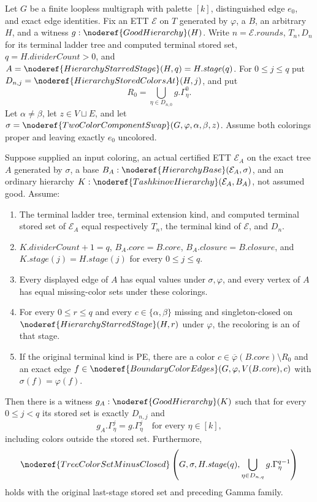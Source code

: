 \begin{helper}
Let $G$ be a finite loopless multigraph with palette $[k]$,
distinguished edge $e_0$, and exact edge identities.
Fix an ETT $\mathcal E$ on $T$ generated by $\varphi$, a
 $B$, an arbitrary
 $H$, and a witness
$g:\noderef{GoodHierarchy}(H)$.  Write $n=\mathcal E.\mathit{rounds}$,
$T_n,D_n$ for its terminal ladder tree and computed terminal stored set,
$q=H.\mathit{dividerCount}>0$, and
$A=\noderef{HierarchyStarredStage}(H,q)=H.\mathit{stage}(q)$.
For $0\le j\le q$ put $D_{n,j}=\noderef{HierarchyStoredColorsAt}(H,j)$,
and put
\[
 R_0=\bigcup_{\eta\in D_{n,0}}g.\Gamma^0_\eta.
\]
Let $\alpha\ne\beta$, let $z\in V\sqcup E$, and let
$\sigma=\noderef{TwoColorComponentSwap}(G,\varphi,\alpha,\beta,z)$.
Assume both colorings proper and leaving exactly $e_0$ uncolored.

Suppose supplied an input coloring, an actual certified ETT
$\mathcal E_A$ on the exact tree $A$ generated by $\sigma$, a base
$B_A:\noderef{HierarchyBase}(\mathcal E_A,\sigma)$, and an ordinary
hierarchy $K:\noderef{TashkinovHierarchy}(\mathcal E_A,B_A)$,
not assumed good.  Assume:
\begin{enumerate}
\item The terminal ladder tree, terminal extension kind, and computed
terminal stored set of $\mathcal E_A$ equal respectively $T_n$, the
terminal kind of $\mathcal E$, and $D_n$.
\item $K.\mathit{dividerCount}+1=q$, $B_A.\mathit{core}=B.\mathit{core}$,
$B_A.\mathit{closure}=B.\mathit{closure}$, and
$K.\mathit{stage}(j)=H.\mathit{stage}(j)$ for every $0\le j\le q$.
\item Every displayed edge of $A$ has equal values under $\sigma,\varphi$,
and every vertex of $A$ has equal missing-color sets under these colorings.
\item For every $0\le r\le q$ and every $c\in\{\alpha,\beta\}$ missing
and singleton-closed on $\noderef{HierarchyStarredStage}(H,r)$ under
$\varphi$, the recoloring is an  of that stage.
\item If the original terminal kind is PE, there are a color
$c\in\overline\varphi(B.\mathit{core})\setminus R_0$ and an exact edge
$f\in\noderef{BoundaryColorEdges}(G,\varphi,V(B.\mathit{core}),c)$
with $\sigma(f)=\varphi(f)$.
\end{enumerate}
Then there is a witness $g_A:\noderef{GoodHierarchy}(K)$ such that
for every $0\le j<q$ its stored set is exactly $D_{n,j}$ and
\[
             g_A.\Gamma^j_\eta=g.\Gamma^j_\eta
                    \quad\text{for every }\eta\in[k],
\]
including colors outside the stored set.  Furthermore,
\[
 \noderef{TreeColorSetMinusClosed}
 \left(G,\sigma,H.\mathit{stage}(q),
       \bigcup_{\eta\in D_{n,q}}g.\Gamma^{q-1}_\eta\right)
\]
holds with the original last-stage stored set and preceding Gamma family.
\end{helper}
